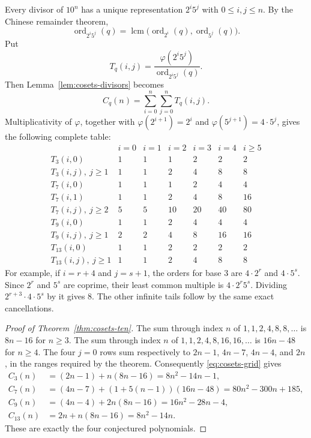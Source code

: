 \documentclass[11pt]{article}
\begin{document}
Every divisor of $10^n$ has a unique representation $2^i5^j$ with
$0\le i,j\le n$. By the Chinese remainder theorem,
\[
 \operatorname{ord}_{2^i5^j}(q)
 =\operatorname{lcm}\bigl(\operatorname{ord}_{2^i}(q),
                         \operatorname{ord}_{5^j}(q)\bigr).
\]
Put
\[
 T_q(i,j)=\frac{\varphi(2^i5^j)}{\operatorname{ord}_{2^i5^j}(q)}.
\]
Then Lemma~\ref{lem:cosets-divisors} becomes
\begin{equation}\label{eq:cosets-grid}
 C_q(n)=\sum_{i=0}^n\sum_{j=0}^n T_q(i,j).
\end{equation}
Multiplicativity of $\varphi$, together with
$\varphi(2^{i+1})=2^i$ and $\varphi(5^{j+1})=4\cdot5^j$,
gives the following complete table:
\[
\begin{array}{c|rrrrrr}
 &i=0&i=1&i=2&i=3&i=4&i\ge5\\\hline
T_3(i,0)&1&1&1&2&2&2\\
T_3(i,j),\ j\ge1&1&1&2&4&8&8\\
T_7(i,0)&1&1&1&2&4&4\\
T_7(i,1)&1&1&2&4&8&16\\
T_7(i,j),\ j\ge2&5&5&10&20&40&80\\
T_9(i,0)&1&1&2&4&4&4\\
T_9(i,j),\ j\ge1&2&2&4&8&16&16\\
T_{13}(i,0)&1&1&2&2&2&2\\
T_{13}(i,j),\ j\ge1&1&1&2&4&8&8
\end{array}
\]
For example, if $i=r+4$ and $j=s+1$, the orders for base $3$ are
$4\cdot2^r$ and $4\cdot5^s$. Since $2^r$ and $5^s$ are coprime,
their least common multiple is $4\cdot2^r5^s$. Dividing
$2^{r+3}\cdot4\cdot5^s$ by it gives $8$. The other infinite
tails follow by the same exact cancellations.

\begin{proof}[Proof of Theorem~\ref{thm:cosets-ten}]
The sum through index $n$ of $1,1,2,4,8,8,\ldots$ is
$8n-16$ for $n\ge3$. The sum through index $n$ of
$1,1,2,4,8,16,16,\ldots$ is $16n-48$ for $n\ge4$.
The four $j=0$ rows sum respectively to $2n-1$, $4n-7$,
$4n-4$, and $2n$, in the ranges required by the theorem.
Consequently \eqref{eq:cosets-grid} gives
\begin{align*}
 C_3(n)&=(2n-1)+n(8n-16)=8n^2-14n-1,\\
 C_7(n)&=(4n-7)+(1+5(n-1))(16n-48)
        =80n^2-300n+185,\\
 C_9(n)&=(4n-4)+2n(8n-16)=16n^2-28n-4,\\
 C_{13}(n)&=2n+n(8n-16)=8n^2-14n.
\end{align*}
These are exactly the four conjectured polynomials.
\end{proof}
\end{document}
